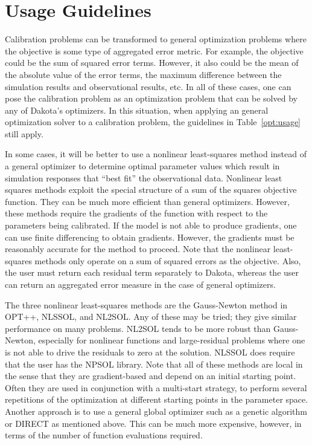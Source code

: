 \section{Usage Guidelines}\label{nls:usage}


Calibration problems can be transformed to general optimization problems 
where the objective is some type of aggregated error metric.  For 
example, the objective could be the sum of squared error terms. 
However, it also could be the mean of the absolute value of the error 
terms, the maximum difference between the simulation results and 
observational results, etc. In all of these cases, one can 
pose the calibration problem as an optimization problem that can be 
solved by any of Dakota's optimizers.  In this situation, when 
applying an general optimization solver to a calibration problem,
the guidelines in Table~\ref{opt:usage} still apply. 

In some cases, it will be better to use a nonlinear least-squares
method instead of a general optimizer to determine optimal parameter 
values which result in simulation responses that ``best fit'' the 
observational data.  Nonlinear least squares methods exploit the 
special structure of a sum of the squares objective function. They 
can be much more efficient than general optimizers.  However, 
these methods require the gradients of the function with 
respect to the parameters being calibrated.  If the model 
is not able to produce gradients, one can use finite differencing 
to obtain gradients.  However, the gradients must be reasonably 
accurate for the method to proceed. Note that the nonlinear 
least-squares methods only operate on a sum of squared errors 
as the objective. Also, the user must return each residual term 
separately to Dakota, whereas the user can return an aggregated 
error measure in the case of general optimizers.

The three nonlinear least-squares methods are the Gauss-Newton method in 
OPT++, NLSSOL, and NL2SOL.  Any of these may be tried;  
they give similar performance on many problems. 
NL2SOL tends to be more robust than Gauss-Newton, especially for nonlinear 
functions and large-residual problems where one is not able to drive 
the residuals to zero at the solution.  NLSSOL does require 
that the user has the NPSOL library.   
Note that all of these methods are local in the sense that they are 
gradient-based and depend on an initial starting point.  Often they 
are used in conjunction with a multi-start strategy, to perform 
several repetitions of the optimization at different starting 
points in the parameter space.  Another approach is to use 
a general global optimizer such as a genetic algorithm or 
DIRECT as mentioned above.  This can be 
much more expensive, however, in terms of the number of function 
evaluations required. 

